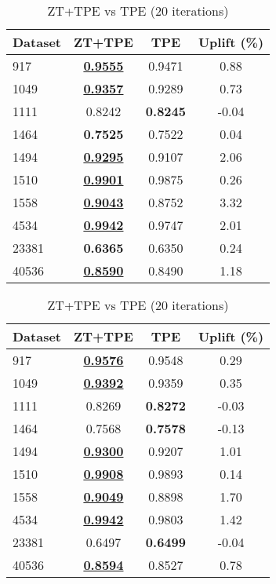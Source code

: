 \begin{table}[htbp]
\begin{center}
\begin{small}
\begin{sc}
\begin{subtable}[t]{0.48\textwidth}
    \centering
    \caption{ZT+TPE vs TPE (10 iterations)}
    \label{tab:randomforest-optuna-10}
    \begin{tabular}{lccc}
    \toprule
    \textbf{Dataset} & \textbf{ZT+TPE} & \textbf{TPE} & \textbf{Uplift (\%)} \\
    \midrule
    917    & \underline{\textbf{0.9555}} & 0.9471 & 0.88 \\
    1049    & \underline{\textbf{0.9357}} & 0.9289 & 0.73 \\
    1111    & 0.8242 & \textbf{0.8245} & -0.04 \\
    1464    & \textbf{0.7525} & 0.7522 & 0.04 \\
    1494    & \underline{\textbf{0.9295}} & 0.9107 & 2.06 \\
    1510    & \underline{\textbf{0.9901}} & 0.9875 & 0.26 \\
    1558    & \underline{\textbf{0.9043}} & 0.8752 & 3.32 \\
    4534    & \underline{\textbf{0.9942}} & 0.9747 & 2.01 \\
    23381    & \textbf{0.6365} & 0.6350 & 0.24 \\
    40536    & \underline{\textbf{0.8590}} & 0.8490 & 1.18 \\
    \bottomrule
    \end{tabular}
\end{subtable}
\hfill
\begin{subtable}[t]{0.48\textwidth}
    \centering
    \caption{ZT+TPE vs TPE (20 iterations)}
    \label{tab:randomforest-optuna-20}
    \begin{tabular}{lccc}
    \toprule
    \textbf{Dataset} & \textbf{ZT+TPE} & \textbf{TPE} & \textbf{Uplift (\%)} \\
    \midrule
    917    & \underline{\textbf{0.9576}} & 0.9548 & 0.29 \\
    1049    & \underline{\textbf{0.9392}} & 0.9359 & 0.35 \\
    1111    & 0.8269 & \textbf{0.8272} & -0.03 \\
    1464    & 0.7568 & \textbf{0.7578} & -0.13 \\
    1494    & \underline{\textbf{0.9300}} & 0.9207 & 1.01 \\
    1510    & \underline{\textbf{0.9908}} & 0.9893 & 0.14 \\
    1558    & \underline{\textbf{0.9049}} & 0.8898 & 1.70 \\
    4534    & \underline{\textbf{0.9942}} & 0.9803 & 1.42 \\
    23381    & 0.6497 & \textbf{0.6499} & -0.04 \\
    40536    & \underline{\textbf{0.8594}} & 0.8527 & 0.78 \\
    \bottomrule
    \end{tabular}
\end{subtable}


\end{sc}
\end{small}
\end{center}
\end{table}
